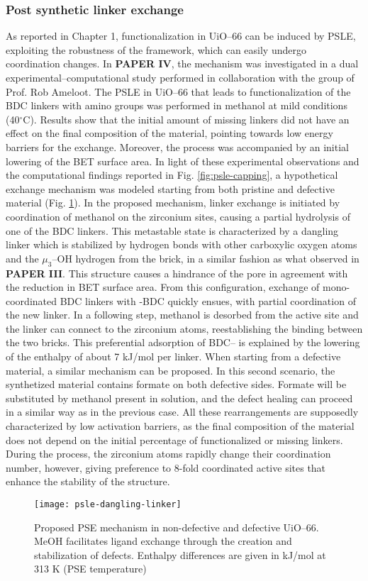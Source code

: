 \subsubsection{Post synthetic linker exchange}
As reported in Chapter 1, functionalization in UiO--66 can be induced by PSLE, exploiting the robustness of the framework, which can easily undergo coordination changes. In \textbf{PAPER IV}, the mechanism was investigated in a dual experimental--computational study performed in collaboration with the group of Prof. Rob Ameloot. The PSLE in UiO--66 that leads to functionalization of the BDC linkers with amino groups was performed in methanol at mild conditions (40$^\circ$C). Results show that the initial amount of missing linkers did not have an effect on the final composition of the material, pointing towards low energy barriers for the exchange. Moreover, the process was accompanied by an initial lowering of the BET surface area. 
\npar
In light of these experimental observations and the computational findings reported in Fig. \ref{fig:psle-capping}, a hypothetical exchange mechanism was modeled starting from both pristine and defective material (Fig. \ref{fig:psle-dangling-linker}). In the proposed mechanism, linker exchange is initiated by coordination of methanol on the zirconium sites, causing a partial hydrolysis of one of the BDC linkers. This metastable state is characterized by a dangling linker which is stabilized by hydrogen bonds with other carboxylic oxygen atoms and the $\mu_3$--OH hydrogen from the brick, in a similar fashion as what observed in \textbf{PAPER III}. This structure causes a hindrance of the pore in agreement with the reduction in BET surface area. From this configuration, exchange of mono-coordinated BDC linkers with -BDC quickly ensues, with partial coordination of the new linker. In a following step, methanol is desorbed from the active site and the linker can connect to the zirconium atoms, reestablishing the binding between the two bricks. This preferential adsorption of BDC-- is explained by the lowering of the enthalpy of about 7 kJ/mol per linker. When starting from a defective material, a similar mechanism can be proposed. In this second scenario, the synthetized material contains formate on both defective sides. Formate will be substituted by methanol present in solution, and the defect healing can proceed in a similar way as in the previous case. All these rearrangements are supposedly characterized by low activation barriers, as the final composition of the material does not depend on the initial percentage of functionalized or missing linkers. During the process, the zirconium atoms rapidly change their coordination number, however, giving preference to 8-fold coordinated active sites that enhance the stability of the structure. 
\begin{figure}[!htbp]
	\centering
	\texttt{[image: psle-dangling-linker]}
	\caption{Proposed PSE mechanism in non-defective and defective UiO--66. MeOH facilitates ligand exchange through the creation and stabilization of defects. Enthalpy differences are given in kJ/mol at 313 K (PSE temperature)}
	\label{fig:psle-dangling-linker}
\end{figure}

